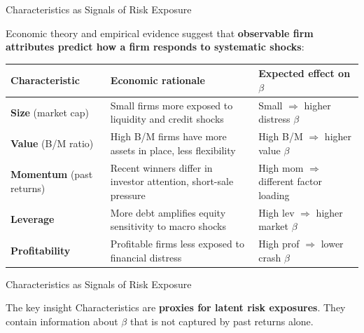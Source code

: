 \documentclass[aspectratio=169]{beamer}
\begin{document}
\begin{frame}{Characteristics as Signals of Risk Exposure}

Economic theory and empirical evidence suggest that \textbf{observable firm attributes
predict how a firm responds to systematic shocks}:

\bigskip
\begin{center}
\begin{tabular}{p{3.2cm} p{4.5cm} p{4.5cm}}
\toprule
\textbf{Characteristic} & \textbf{Economic rationale} & \textbf{Expected effect on $\beta$} \\
\midrule
\textbf{Size} (market cap)
  & Small firms more exposed to liquidity and credit shocks
  & Small $\Rightarrow$ higher distress $\beta$ \\[6pt]
\textbf{Value} (B/M ratio)
  & High B/M firms have more assets in place, less flexibility
  & High B/M $\Rightarrow$ higher value $\beta$ \\[6pt]
\textbf{Momentum} (past returns)
  & Recent winners differ in investor attention, short-sale pressure
  & High mom $\Rightarrow$ different factor loading \\[6pt]
\textbf{Leverage}
  & More debt amplifies equity sensitivity to macro shocks
  & High lev $\Rightarrow$ higher market $\beta$ \\[6pt]
\textbf{Profitability}
  & Profitable firms less exposed to financial distress
  & High prof $\Rightarrow$ lower crash $\beta$ \\
\bottomrule
\end{tabular}
\end{center}
\end{frame}
%
%
\begin{frame}{Characteristics as Signals of Risk Exposure}
\begin{block}{The key insight}
Characteristics are \textbf{proxies for latent risk exposures}. They contain information
about $\beta$ that is not captured by past returns alone.
\end{block}

\end{frame}
%
%
\end{document}
